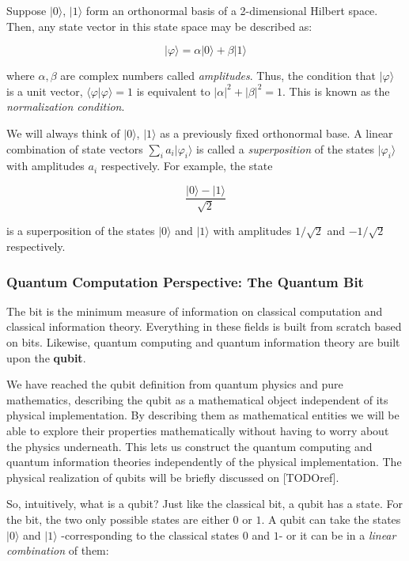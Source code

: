 Suppose $|0\rangle$, $|1\rangle$ form an orthonormal basis of a 2-dimensional Hilbert space. Then, any state vector in this state space may be described as:

$$ |\varphi\rangle = \alpha|0\rangle + \beta|1\rangle $$

where $\alpha,\beta$ are complex numbers called \emph{amplitudes}. Thus, the condition that $|\varphi\rangle$ is a unit vector, $\langle\varphi|\varphi\rangle = 1$ is equivalent to $|\alpha|^2 + |\beta|^2 = 1$. This is known as the \emph{normalization condition}.

We will always think of $|0\rangle$, $|1\rangle$ as a previously fixed orthonormal base. A linear combination of state vectors $\sum_i a_i |\varphi_i\rangle$ is called a \emph{superposition} of the states $|\varphi_i\rangle$ with amplitudes $a_i$ respectively. For example, the state

$$ \frac{|0\rangle - |1\rangle}{\sqrt 2} $$

is a superposition of the states $|0\rangle$ and $|1\rangle$ with amplitudes $1/\sqrt 2$ and $-1/\sqrt 2$ respectively.


\subsubsection{Quantum Computation Perspective: The Quantum Bit}


The bit is the minimum measure of information on classical computation and classical information theory. Everything in these fields is built from scratch based on bits. Likewise, quantum computing and quantum information theory are built upon the \textbf{qubit}.

We have reached the qubit definition from quantum physics and pure mathematics, describing the qubit as a mathematical object independent of its physical implementation. By describing them as mathematical entities we will be able to explore their properties mathematically without having to worry about the physics underneath. This lets us construct the quantum computing and quantum information theories independently of the physical implementation. The physical realization of qubits will be briefly discussed on [TODOref].

So, intuitively, what is a qubit? Just like the classical bit, a qubit has a state. For the bit, the two only possible states are either $0$ or $1$. A qubit can take the states $|0\rangle$ and $|1\rangle$ -corresponding to the classical states $0$ and $1$- or it can be in a \emph{linear combination} of them:

